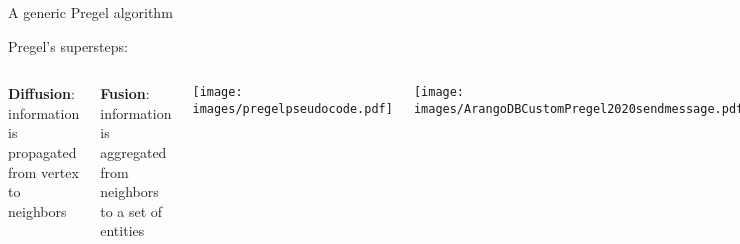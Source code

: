 \documentclass[aspectratio = 169, 15pt, trans]{beamer}
\begin{document}
    \begin{frame}{A generic Pregel algorithm}
        
        \hspace*{-0.7cm}
        {\color{darkgray}Pregel's supersteps:}
        \begin{columns}[t]
                \vspace*{-0.3cm}
                
                \hspace*{-0.1cm}
                \small \textbf{Diffusion}: information is propagated from vertex to neighbors
                
                \hspace*{-0.1cm}
                \small \textbf{Fusion}: information is aggregated from neighbors to a set of entities
                
                \vspace*{-1cm}
                \hspace*{-2cm}
                \begin{center}
                    \texttt{[image: images/pregelpseudocode.pdf]}
                \end{center}
                
                \vspace*{-0.1cm}
                \begin{center}
                    \hspace*{-4.7cm}
                    \texttt{[image: images/ArangoDBCustomPregel2020sendmessage.pdf]}
                \end{center}
        \end{columns}
    \end{frame}
    
\end{document}
